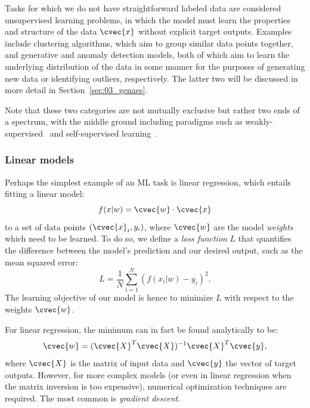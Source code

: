 Tasks for which we do not have straightforward labeled data are considered unsupervised learning problems, in which the model must learn the properties and structure of the data $\cvec{x}$ without explicit target outputs.
Examples include clustering algorithms, which aim to group similar data points together, and generative and anomaly detection models, both of which aim to learn the underlying distribution of the data in some manner for the purposes of generating new data or identifying outliers, respectively.
The latter two will be discussed in more detail in Section~\ref{sec:03_genaes}.

Note that these two categories are not mutually exclusive but rather two ends of a spectrum, with the middle ground including paradigms such as weakly-supervised~\cite{chapelle2006semisupervised} and self-supervised learning~\cite{balestriero2023cookbookselfsupervisedlearning}.

\subsubsection{Linear models}

Perhaps the simplest example of an ML task is linear regression, which entails fitting a linear model:
\begin{equation}
    \label{eq:03_ml_linear}
    f(x|w) = \cvec{w} \cdot \cvec{x}
\end{equation}
to a set of data points $(\cvec{x}_i, y_i)$, where $\cvec{w}$ are the model \textit{weights} which need to be learned.
To do so, we define a \textit{loss function} $L$ that quantifies the difference between the model's prediction and our desired output, such as the mean squared error:
\begin{equation}
    \label{eq:03_ml_mse}
    L = \frac{1}{N} \sum_{i=1}^N (f(x_i|w) - y_i)^2.
\end{equation}
The learning objective of our model is hence to minimize $L$ with respect to the weights $\cvec{w}$.

For linear regression, the minimum can in fact be found analytically to be:
\begin{equation}
    \label{eq:03_ml_linear_soln}
    \cvec{w} = (\cvec{X}^T \cvec{X})^{-1} \cvec{X}^T \cvec{y},
\end{equation}
where $\cvec{X}$ is the matrix of input data and $\cvec{y}$ the vector of target outputs.
However, for more complex models (or even in linear regression when the matrix inversion is too expensive), numerical optimization techniques are required.
The most common is \textit{gradient descent}.

